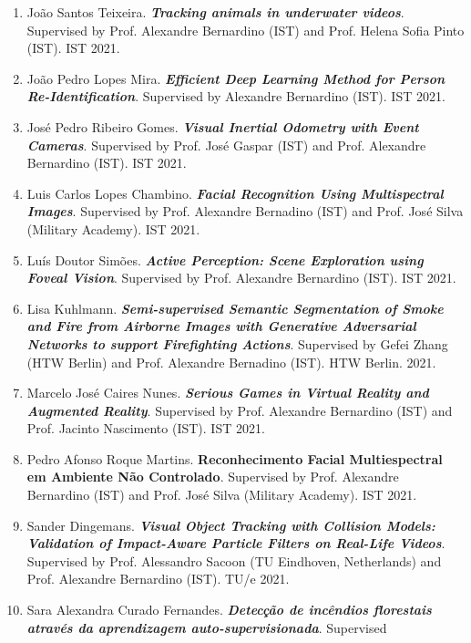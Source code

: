 \documentclass[
]{article}
\begin{document}
\begin{enumerate}
{{  Models of Distributed Computer Vision Methods for Decision Making in
  Detection and Tracking Algorithms in UAVs}}. Supervised by Prof
  Alexandre Bernardino (IST) and Prof. Ricardo Ribeiro (IST). IST 2021.
\item
  João Santos Teixeira. \emph{\textbf{Tracking animals in underwater
  videos}}. Supervised by Prof. Alexandre Bernardino (IST) and Prof.
  Helena Sofia Pinto (IST). IST 2021.
\item
  João Pedro Lopes Mira. \emph{\textbf{Efficient Deep Learning Method
  for Person Re-Identification}}. Supervised by Alexandre Bernardino
  (IST). IST 2021.
\item
  José Pedro Ribeiro Gomes. \emph{\textbf{Visual Inertial Odometry with
  Event Cameras}}. Supervised by Prof. José Gaspar (IST) and Prof.
  Alexandre Bernardino (IST). IST 2021.
\item
  Luis Carlos Lopes Chambino. \emph{\textbf{Facial Recognition Using
  Multispectral Images}}. Supervised by Prof. Alexandre Bernadino (IST)
  and Prof. José Silva (Military Academy). IST 2021.
\item
  Luís Doutor Simões. \emph{\textbf{Active Perception: Scene Exploration
  using Foveal Vision}}. Supervised by Prof. Alexandre Bernardino (IST).
  IST 2021.
\item
  Lisa Kuhlmann. \emph{\textbf{Semi-supervised Semantic Segmentation of
  Smoke and Fire from Airborne Images with Generative Adversarial
  Networks to support Firefighting Actions}}. Supervised by Gefei Zhang
  (HTW Berlin) and Prof. Alexandre Bernadino (IST). HTW Berlin. 2021.
\item
  Marcelo José Caires Nunes. \emph{\textbf{Serious Games in Virtual
  Reality and Augmented Reality}}. Supervised by Prof. Alexandre
  Bernardino (IST) and Prof. Jacinto Nascimento (IST). IST 2021.
\item
  Pedro Afonso Roque Martins. \textbf{Reconhecimento Facial
  Multiespectral em Ambiente Não Controlado}. Supervised by Prof.
  Alexandre Bernardino (IST) and Prof. José Silva (Military Academy).
  IST 2021.
\item
  Sander Dingemans. \emph{\textbf{Visual Object Tracking with Collision
  Models: Validation of Impact-Aware Particle Filters on Real-Life
  Videos}}. Supervised by Prof. Alessandro Sacoon (TU Eindhoven,
  Netherlands) and Prof. Alexandre Bernardino (IST). TU/e 2021.
\item
  Sara Alexandra Curado Fernandes. \emph{\textbf{Detecção de incêndios
  florestais através da aprendizagem auto-supervisionada}}. Supervised

\end{enumerate}
\end{document}

